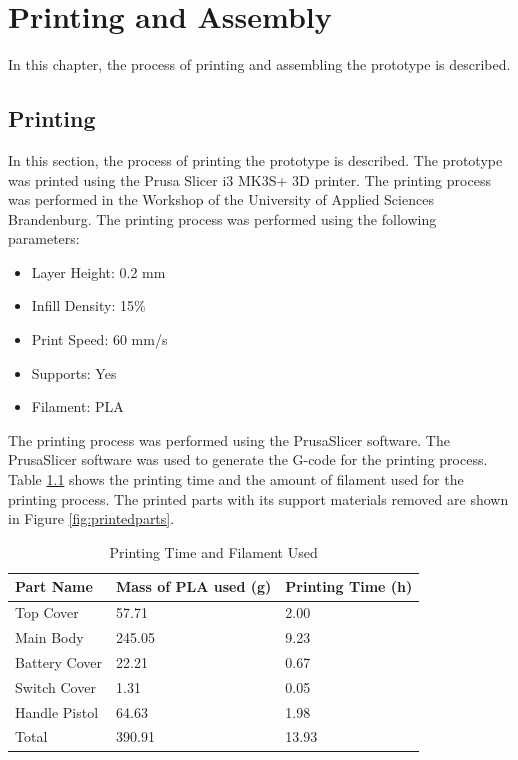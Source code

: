\chapter{Printing and Assembly}
\label{ch:printingandassembly}

In this chapter, the process of printing and assembling the prototype is described.

\section{Printing}
\label{sec:printing}

In this section, the process of printing the prototype is described. The prototype was printed using the Prusa Slicer i3 MK3S+ 3D printer. The printing process was performed in the Workshop of the University of Applied Sciences Brandenburg. The printing process was performed using the following parameters:

\begin{itemize}
    \item Layer Height: 0.2 mm
    \item Infill Density: 15\%
    \item Print Speed: 60 mm/s
    \item Supports: Yes
    \item Filament: PLA
\end{itemize}

The printing process was performed using the PrusaSlicer software. The PrusaSlicer software was used to generate the G-code for the printing process. Table \ref{tab:finalprintingtimeandfilament} shows the printing time and the amount of filament used for the printing process. The printed parts with its support materials removed are shown in Figure \ref{fig:printedparts}.


\begin{table}[!ht]
    \centering
    \begin{tabular}{|l|l|l|}
        \hline
        \textbf{Part Name} & \textbf{Mass of PLA used (g)} & \textbf{Printing Time (h)} \\ \hline
        Top Cover          & 57.71                         & 2.00                       \\ \hline
        Main Body          & 245.05                        & 9.23                       \\ \hline
        Battery Cover      & 22.21                         & 0.67                       \\ \hline
        Switch Cover       & 1.31                          & 0.05                       \\ \hline
        Handle Pistol      & 64.63                         & 1.98                       \\ \hline
        Total              & 390.91                        & 13.93                      \\ \hline
    \end{tabular}
    \caption{Printing Time and Filament Used}
    \label{tab:finalprintingtimeandfilament}
\end{table}



